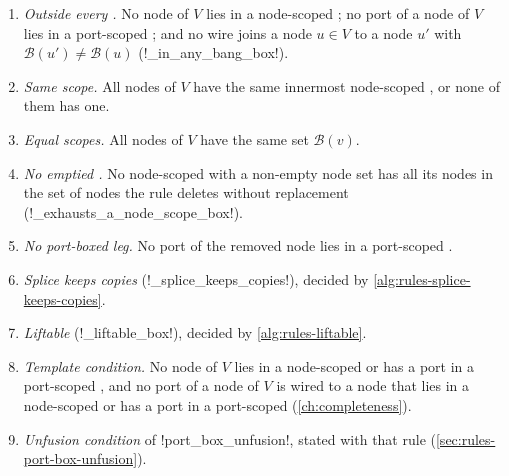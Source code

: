 \begin{definition}\label{def:rules-box-conditions}
\leavevmode
\begin{enumerate}
\item[O] \emph{Outside every \bbox{}.} No node of $V$ lies in a node-scoped \bbox{}; no port of a node of $V$ lies in a port-scoped \bbox{}; and no wire joins a node $u\in V$ to a node $u'$ with $\mathcal{B}(u')\ne\mathcal{B}(u)$ (\py!_in_any_bang_box!).
\item[S] \emph{Same scope.} All nodes of $V$ have the same innermost node-scoped \bbox{}, or none of them has one.
\item[E] \emph{Equal scopes.} All nodes of $V$ have the same set $\mathcal{B}(v)$.
\item[N] \emph{No emptied \bbox{}.} No node-scoped \bbox{} with a non-empty node set has all its nodes in the set of nodes the rule deletes without replacement (\py!_exhausts_a_node_scope_box!).
\item[P] \emph{No port-boxed leg.} No port of the removed node lies in a port-scoped \bbox{}.
\item[K] \emph{Splice keeps copies} (\py!_splice_keeps_copies!), decided by \cref{alg:rules-splice-keeps-copies}.
\item[L] \emph{Liftable \bbox{}} (\py!_liftable_box!), decided by \cref{alg:rules-liftable}.
\item[T] \emph{Template condition.} No node of $V$ lies in a node-scoped \bbox{} or has a port in a port-scoped \bbox{}, and no port of a node of $V$ is wired to a node that lies in a node-scoped \bbox{} or has a port in a port-scoped \bbox{} (\cref{ch:completeness}).
\item[U] \emph{Unfusion condition} of \azx!port_box_unfusion!, stated with that rule (\cref{sec:rules-port-box-unfusion}).
\end{enumerate}
\end{definition}

